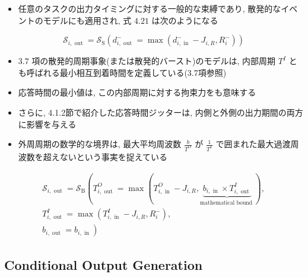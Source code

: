 \begin{frame}{}
    \begin{itemize}
        \item 任意のタスクの出力タイミングに対する一般的な束縛であり, 散発的なイベントのモデルにも適用され, 式 $4.21$ は次のようになる
    \end{itemize}

    \begin{equation*}
        \mathcal{S}_{i, \text { out }}=\mathcal{S}_{\mathrm{S}}\left(d_{i, \text { out }}^{-}=\max \left(d_{i, \text { in }}^{-}-J_{i, R}, R_{i}^{-}\right)\right)
    \end{equation*}
\end{frame}

\begin{frame}{}
    \begin{itemize}
        \item $3.7$ 項の散発的周期事象(または散発的バースト)のモデルは, 内部周期 $T^{I}$ とも呼ばれる最小相互到着時間を定義している(3.7項参照)
        \item 応答時間の最小値は, この内部周期に対する拘束力をも意味する
        \item さらに, 4.1.2節で紹介した応答時間ジッターは, 内側と外側の出力期間の両方に影響を与える


        \item 外周周期の数学的な境界は, 最大平均周波数 $\frac{b}{T^{O}}$ が $\frac{1}{T^{1}}$ で囲まれた最大過渡周波数を超えないという事実を捉えている
    \end{itemize}
    \begin{equation*}
        \begin{gathered}
            \mathcal{S}_{i, \text { out }}=\mathcal{S}_{\mathrm{B}}\left(T_{i, \text { out }}^{O}=\max (T_{i, \text { in }}^{O}-J_{i, R}, \underbrace{b_{i, \text { in }} \times T_{i, \text { out }}^{I}}_{\text {mathematical bound }}),\right. \\
            T_{i, \text { out }}^{I}=\max \left(T_{i, \text { in }}^{I}-J_{i, R}, R_{i}^{-}\right), \\
            \left.b_{i, \text { out }}=b_{i, \text { in }}\right)
        \end{gathered}
    \end{equation*}
\end{frame}


\subsection{Conditional Output Generation}
\label{ssec: conditional output generation}

